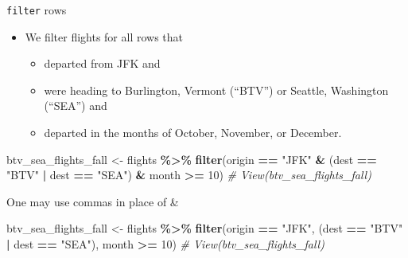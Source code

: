 \documentclass[
  ignorenonframetext,
]{beamer}
\newenvironment{Shaded}{\begin{snugshade}}{\end{snugshade}}
\newcommand{\CommentTok}[1]{\textcolor[rgb]{0.56,0.35,0.01}{\textit{#1}}}
\newcommand{\DecValTok}[1]{\textcolor[rgb]{0.00,0.00,0.81}{#1}}
\newcommand{\FunctionTok}[1]{\textcolor[rgb]{0.13,0.29,0.53}{\textbf{#1}}}
\newcommand{\NormalTok}[1]{#1}
\newcommand{\OtherTok}[1]{\textcolor[rgb]{0.56,0.35,0.01}{#1}}
\newcommand{\SpecialCharTok}[1]{\textcolor[rgb]{0.81,0.36,0.00}{\textbf{#1}}}
\newcommand{\StringTok}[1]{\textcolor[rgb]{0.31,0.60,0.02}{#1}}
\providecommand{\tightlist}{%
  \setlength{\itemsep}{0pt}\setlength{\parskip}{0pt}}
\begin{document}
\begin{frame}[fragile]{\texttt{filter} rows}
\protect\hypertarget{filter-rows-3}{}
\begin{itemize}
\item
  We filter flights for all rows that

  \begin{itemize}
  \tightlist
  \item
    departed from JFK and
  \item
    were heading to Burlington, Vermont (``BTV'') or Seattle, Washington
    (``SEA'') and
  \item
    departed in the months of October, November, or December.
  \end{itemize}
\end{itemize}

\normalsize

\begin{Shaded}
\begin{Highlighting}[]
\NormalTok{btv\_sea\_flights\_fall }\OtherTok{\textless{}{-}}\NormalTok{ flights }\SpecialCharTok{\%\textgreater{}\%} 
  \FunctionTok{filter}\NormalTok{(origin }\SpecialCharTok{==} \StringTok{"JFK"} \SpecialCharTok{\&}\NormalTok{ (dest }\SpecialCharTok{==} \StringTok{"BTV"} \SpecialCharTok{|}\NormalTok{ dest }\SpecialCharTok{==} \StringTok{"SEA"}\NormalTok{) }\SpecialCharTok{\&} 
\NormalTok{         month }\SpecialCharTok{\textgreater{}=} \DecValTok{10}\NormalTok{)}
\CommentTok{\# View(btv\_sea\_flights\_fall)}
\end{Highlighting}
\end{Shaded}

\normalsize

One may use commas in place of \&

\normalsize

\begin{Shaded}
\begin{Highlighting}[]
\NormalTok{btv\_sea\_flights\_fall }\OtherTok{\textless{}{-}}\NormalTok{ flights }\SpecialCharTok{\%\textgreater{}\%} 
  \FunctionTok{filter}\NormalTok{(origin }\SpecialCharTok{==} \StringTok{"JFK"}\NormalTok{, (dest }\SpecialCharTok{==} \StringTok{"BTV"} \SpecialCharTok{|}\NormalTok{ dest }\SpecialCharTok{==} \StringTok{"SEA"}\NormalTok{), }
\NormalTok{         month }\SpecialCharTok{\textgreater{}=} \DecValTok{10}\NormalTok{)}
\CommentTok{\# View(btv\_sea\_flights\_fall)}
\end{Highlighting}
\end{Shaded}

\normalsize
\end{frame}
\end{document}
